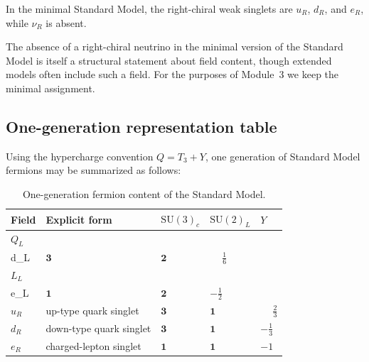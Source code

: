 \documentclass[11pt,a4paper]{article}
\newcommand{\SUc}{\mathrm{SU}(3)_c}
\newcommand{\SUw}{\mathrm{SU}(2)_L}
\begin{document}
In the minimal Standard Model, the right-chiral weak singlets are
\(u_R\), \(d_R\), and \(e_R\), while \(\nu_R\) is absent.


The absence of a right-chiral neutrino in the minimal version of the Standard Model is itself a structural statement about field content, though extended models often include such a field. For the purposes of Module~3 we keep the minimal assignment.




\subsection{One-generation representation table}

Using the hypercharge convention \(Q=T_3+Y\), one generation of Standard Model fermions may be summarized as follows:



\begin{table}[H]
\centering
\caption{One-generation fermion content of the Standard Model.}
\label{tab:one-generation-clean}
\begin{tabular}{>{\raggedright\arraybackslash}p{}>{\raggedright\arraybackslash}p{}>{\centering\arraybackslash}p{}>{\centering\arraybackslash}p{}>{\centering\arraybackslash}p{}}
\toprule
Field & Explicit form & \(\SUc\) & \(\SUw\) & \(Y\) \\
\midrule
\(Q_L\) & \(\begin{pmatrix}u_L\\ d_L\end{pmatrix}\) & \(\mathbf{3}\) & \(\mathbf{2}\) & \(\phantom{-}\frac16\) \\
\(L_L\) & \(\begin{pmatrix}\nu_L\\ e_L\end{pmatrix}\) & \(\mathbf{1}\) & \(\mathbf{2}\) & \(-\frac12\) \\
\(u_R\) & up-type quark singlet & \(\mathbf{3}\) & \(\mathbf{1}\) & \(\phantom{-}\frac23\) \\
\(d_R\) & down-type quark singlet & \(\mathbf{3}\) & \(\mathbf{1}\) & \(-\frac13\) \\
\(e_R\) & charged-lepton singlet & \(\mathbf{1}\) & \(\mathbf{1}\) & \(-1\) \\
\bottomrule
\end{tabular}
\end{table}
\end{document}
